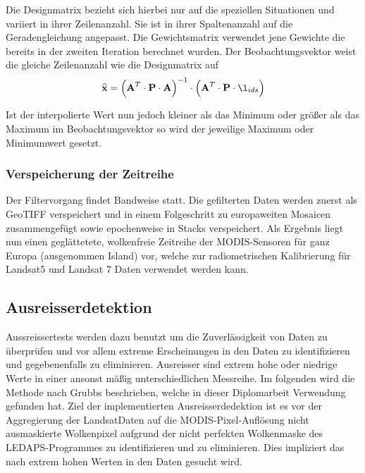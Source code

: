 \documentclass[11pt]{report}
\begin{document}
Die Designmatrix bezieht sich hierbei nur auf die speziellen Situationen und variiert in ihrer Zeilenanzahl. Sie ist in ihrer Spaltenanzahl auf die Geradengleichung angepasst. Die Gewichtsmatrix verwendet jene Gewichte die bereits in der zweiten Iteration berechnet wurden. Der Beobachtungsvektor weist die gleiche Zeilenanzahl wie die Designmatrix auf
\begin{equation}
\widehat{\textbf{x}} = \left(\textbf{A}^T\cdot\textbf{P}\cdot\textbf{A}\right)^{-1}\cdot\left(\textbf{A}^T\cdot\textbf{P}\cdot\l_{ids}\right)
\end{equation}\newline

Ist der interpolierte Wert nun jedoch kleiner als das Minimum oder größer als das Maximum im Beobachtungsvektor so wird der jeweilige Maximum oder Minimumwert gesetzt.

\subsubsection{Verspeicherung der Zeitreihe}
Der Filtervorgang findet Bandweise statt. Die gefilterten Daten werden zuerst als GeoTIFF verspeichert und in einem Folgeschritt zu europaweiten Mosaicen zusammengefügt sowie epochenweise in Stacks verspeichert. Als Ergebnis liegt nun einen geglättetete, wolkenfreie Zeitreihe der MODIS-Sensoren für ganz Europa (ausgenommen Island) vor, welche zur radiometrischen Kalibrierung für Landsat5 und Landsat 7 Daten verwendet werden kann.


\subsection{Ausreisserdetektion}
Aussreissertests werden dazu benutzt um die Zuverlässigkeit von Daten zu überprüfen und vor allem extreme Erscheinungen in den Daten zu identifizieren und gegebenenfalls zu eliminieren. Ausreisser sind extrem hohe oder niedrige Werte in einer ansonst mäßig unterschiedlichen Messreihe. Im folgenden wird die Methode nach Grubbs beschrieben, welche in dieser Diplomarbeit Verwendung gefunden hat. Ziel der implementierten Ausreisserdedektion ist es vor der Aggregierung der LandsatDaten auf die MODIS-Pixel-Auflösung nicht ausmaskierte Wolkenpixel aufgrund der nicht perfekten Wolkenmaske des LEDAPS-Programmes zu identifizieren und zu eliminieren. Dies impliziert das nach extrem hohen Werten in den Daten gesucht wird. \newline
\end{document}
